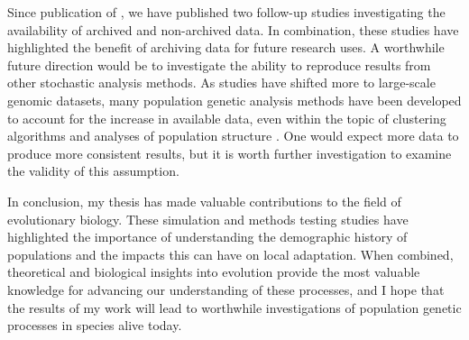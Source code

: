 Since publication of , we have published two follow-up studies investigating the availability of archived \citep{Vines:2013} and non-archived \citep{Vines:2014} data. In combination, these studies have highlighted the benefit of archiving data for future research uses. A worthwhile future direction would be to investigate the ability to reproduce results from other stochastic analysis methods. As studies have shifted more to large-scale genomic datasets, many population genetic analysis methods have been developed to account for the increase in available data, even within the topic of clustering algorithms and analyses of population structure \citep{Raj:2014,Bradburd:2016, Petkova:2015}. One would expect more data to produce more consistent results, but it is worth further investigation to examine the validity of this assumption.

In conclusion, my thesis has made valuable contributions to the field of evolutionary biology. These simulation and methods testing studies have highlighted the importance of understanding the demographic history of populations and the impacts this can have on local adaptation. When combined, theoretical and biological insights into evolution provide the most valuable knowledge for advancing our understanding of these processes, and I hope that the results of my work will lead to worthwhile investigations of population genetic processes in species alive today.





